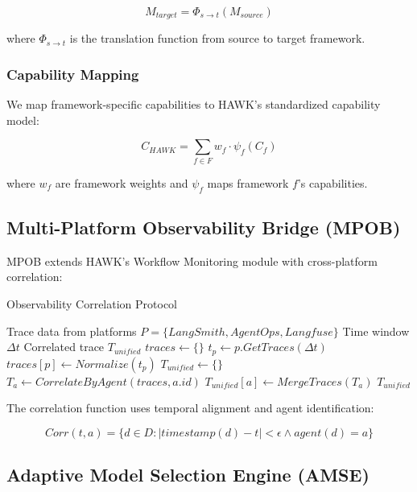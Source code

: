 \documentclass[conference]{IEEEtran}
\begin{document}
\begin{equation}
M_{target} = \Phi_{s \rightarrow t}(M_{source})
\end{equation}

where $\Phi_{s \rightarrow t}$ is the translation function from source to target framework.

\subsubsection{Capability Mapping}
We map framework-specific capabilities to HAWK's standardized capability model:

\begin{equation}
C_{HAWK} = \sum_{f \in F} w_f \cdot \psi_f(C_f)
\end{equation}

where $w_f$ are framework weights and $\psi_f$ maps framework $f$'s capabilities.

\subsection{Multi-Platform Observability Bridge (MPOB)}

MPOB extends HAWK's Workflow Monitoring module with cross-platform correlation:

\begin{algorithm}
\caption{Observability Correlation Protocol}
\label{alg:mpob}
\begin{algorithmic}[1]
\REQUIRE Trace data from platforms $P = \{LangSmith, AgentOps, Langfuse\}$
\REQUIRE Time window $\Delta t$
\ENSURE Correlated trace $T_{unified}$
\STATE $traces \gets \{\}$
    \STATE $t_p \gets p.GetTraces(\Delta t)$
    \STATE $traces[p] \gets Normalize(t_p)$
\ENDFOR
\STATE $T_{unified} \gets \{\}$
    \STATE $T_a \gets CorrelateByAgent(traces, a.id)$
    \STATE $T_{unified}[a] \gets MergeTraces(T_a)$
\ENDFOR
\RETURN $T_{unified}$
\end{algorithmic}
\end{algorithm}

The correlation function uses temporal alignment and agent identification:

\begin{equation}
Corr(t, a) = \{d \in D : |timestamp(d) - t| < \epsilon \land agent(d) = a\}
\end{equation}

\subsection{Adaptive Model Selection Engine (AMSE)}
\end{document}
